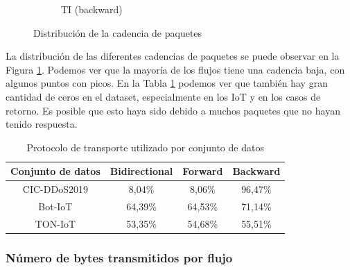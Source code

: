 \begin{figure}[H]
\begin{subfigure}[b]{0.26\textwidth}
        \caption{TI (backward)}
    \end{subfigure}
    \hfill
       \caption{Distribución de la cadencia de paquetes}
       \label{fig:packet_pincer_packet_second}
\end{figure}

La distribución de las diferentes cadencias de paquetes se puede observar en la Figura \ref{fig:packet_pincer_packet_second}. Podemos ver que la mayoría de los flujos tiene una cadencia baja, con algunos puntos con picos. En la Tabla \ref{table:packet_pincer_packet_second_zeroes} podemos ver que también hay gran cantidad de ceros en el dataset, especialmente en los IoT y en los casos de retorno. Es posible que esto haya sido debido a muchos paquetes que no hayan tenido respuesta.

\begin{table}[H]
    \centering
    \begin{tabular}{|c | c c c |}
        \hline
        \textbf{Conjunto de datos} & \textbf{Bidirectional} & \textbf{Forward} & \textbf{Backward} \\ \hline
        CIC-DDoS2019               & 8,04\%                 & 8,06\%           & 96,47\% \\
        Bot-IoT                    & 64,39\%                & 64,53\%          & 71,14\% \\
        TON-IoT                    & 53,35\%                & 54,68\%          & 55,51\% \\
        \hline
    \end{tabular}
    \caption{Protocolo de transporte utilizado por conjunto de datos}
    \label{table:packet_pincer_packet_second_zeroes}
\end{table}

\subsubsection{Número de bytes transmitidos por flujo}

